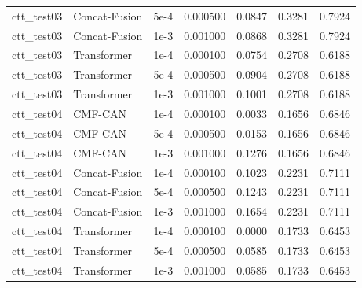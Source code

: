 \begin{tabular}{lllrlll}
ctt_test03 & Concat-Fusion & 5e-4 & 0.000500 & 0.0847 & 0.3281 & 0.7924 \\
ctt_test03 & Concat-Fusion & 1e-3 & 0.001000 & 0.0868 & 0.3281 & 0.7924 \\
ctt_test03 & Transformer & 1e-4 & 0.000100 & 0.0754 & 0.2708 & 0.6188 \\
ctt_test03 & Transformer & 5e-4 & 0.000500 & 0.0904 & 0.2708 & 0.6188 \\
ctt_test03 & Transformer & 1e-3 & 0.001000 & 0.1001 & 0.2708 & 0.6188 \\
ctt_test04 & CMF-CAN & 1e-4 & 0.000100 & 0.0033 & 0.1656 & 0.6846 \\
ctt_test04 & CMF-CAN & 5e-4 & 0.000500 & 0.0153 & 0.1656 & 0.6846 \\
ctt_test04 & CMF-CAN & 1e-3 & 0.001000 & 0.1276 & 0.1656 & 0.6846 \\
ctt_test04 & Concat-Fusion & 1e-4 & 0.000100 & 0.1023 & 0.2231 & 0.7111 \\
ctt_test04 & Concat-Fusion & 5e-4 & 0.000500 & 0.1243 & 0.2231 & 0.7111 \\
ctt_test04 & Concat-Fusion & 1e-3 & 0.001000 & 0.1654 & 0.2231 & 0.7111 \\
ctt_test04 & Transformer & 1e-4 & 0.000100 & 0.0000 & 0.1733 & 0.6453 \\
ctt_test04 & Transformer & 5e-4 & 0.000500 & 0.0585 & 0.1733 & 0.6453 \\
ctt_test04 & Transformer & 1e-3 & 0.001000 & 0.0585 & 0.1733 & 0.6453 \\
\bottomrule
\end{tabular}
